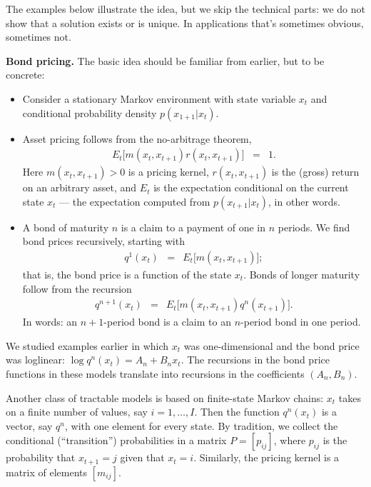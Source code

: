 \documentclass[11pt]{article}
\begin{document}
The examples below illustrate the idea, but we skip the technical parts:
we do not show that a solution exists or is unique.  
In applications that's sometimes obvious, sometimes not.  

{\bf Bond pricing.\/}
The basic idea should be familiar from earlier,
but to be concrete:
%
\begin{itemize}
\item Consider a stationary Markov environment
with state variable $x_t$ and conditional probability density
$ p(x_{1+1} | x_t) $.
\item Asset pricing follows from the no-arbitrage theorem,
\begin{eqnarray*}
    E_t \big[ m(x_t,x_{t+1}) r(x_t,x_{t+1}) \big] &=& 1.
\end{eqnarray*}
Here $ m(x_t,x_{t+1})>0$ is a pricing kernel,
$r(x_t,x_{t+1})$ is the (gross) return on an arbitrary asset,
and $E_t$ is the expectation conditional on the current state $x_t$
--- the expectation computed from $p(x_{t+1} | x_t)$, in other words.

\item A bond of maturity $n$ is a claim to a payment of one in $n$ periods.
We find bond prices recursively, starting with
\begin{eqnarray*}
    q^1(x_t) &=& E_t \big[ m(x_t,x_{t+1}) \big] ;
\end{eqnarray*}
that is, the bond price is a function of the state $x_t$.
Bonds of longer maturity follow from the recursion
\begin{eqnarray}
    q^{n+1}(x_t) &=& E_t \big[ m(x_t,x_{t+1}) q^n(x_{t+1})\big] .
    \label{eq:recursion-bond}
\end{eqnarray}
In words:  an $n+1$-period bond is a claim to an $n$-period bond in one period.
\end{itemize}
We studied examples earlier in which $x_t$ was one-dimensional
and the bond price was loglinear:  $ \log q^n(x_t) = A_n + B_n x_t$.
The recursions in the bond price functions in these models translate into recursions
in the coefficients $ (A_n,B_n) $.

Another class of tractable models is based on finite-state Markov chains:
$x_t$ takes on a finite number of values, say $i = 1,\ldots, I$.
Then the function $q^n(x_t)$ is a vector, say $q^n$,
with one element for every state.
By tradition, we collect the conditional (``transition'') probabilities 
in a matrix $P = [p_{ij}]$,
where $p_{ij}$ is the probability that $x_{t+1} = j$ given that $x_t = i$.
Similarly, the pricing kernel is a matrix of elements $[m_{ij}]$.
\end{document}
